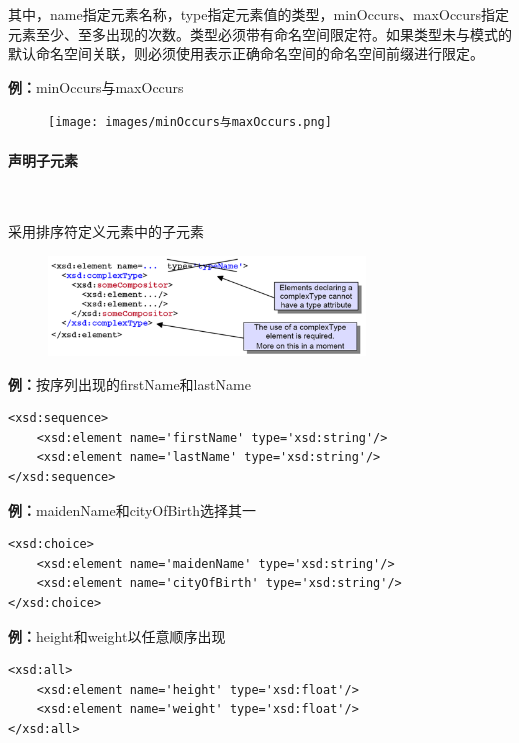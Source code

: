 其中，name指定元素名称，type指定元素值的类型，minOccurs、maxOccurs指定元素至少、至多出现的次数。类型必须带有命名空间限定符。如果类型未与模式的默认命名空间关联，则必须使用表示正确命名空间的命名空间前缀进行限定。

\textbf{例：}minOccurs与maxOccurs
\begin{figure}[H]
    \vspace{-0.5em}
	\centering
	\texttt{[image: images/minOccurs与maxOccurs.png]}
    \vspace{-3em}
\end{figure}

\paragraph*{声明子元素}~{} \par
采用排序符定义元素中的子元素
\begin{figure}[H]
    \vspace{-0.5em}
	\centering
	\includegraphics[width=0.75\textwidth]{images/采用排序符定义元素中的子元素}
    \vspace{-1em}
\end{figure}

\textbf{例：}按序列出现的firstName和lastName
\begin{lstlisting}
<xsd:sequence>
 	<xsd:element name='firstName' type='xsd:string'/>
	<xsd:element name='lastName' type='xsd:string'/>
</xsd:sequence>
\end{lstlisting}

\textbf{例：}maidenName和cityOfBirth选择其一
\begin{lstlisting}
<xsd:choice>
	<xsd:element name='maidenName' type='xsd:string'/>
	<xsd:element name='cityOfBirth' type='xsd:string'/>
</xsd:choice>
\end{lstlisting}

\textbf{例：}height和weight以任意顺序出现
\begin{lstlisting}
<xsd:all>
	<xsd:element name='height' type='xsd:float'/>
	<xsd:element name='weight' type='xsd:float'/>
</xsd:all>
\end{lstlisting}

